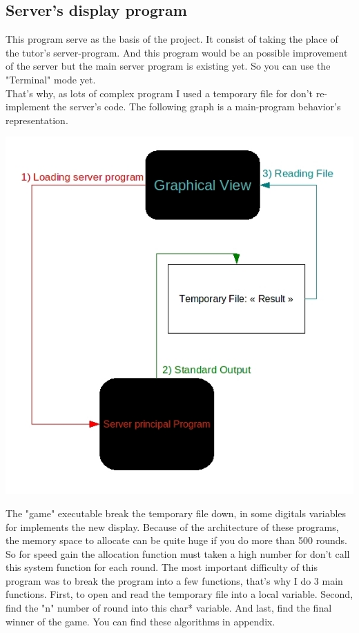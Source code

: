 \documentclass[11pt]{sample}
\begin{document}
\subsection{Server's display program}
This program serve as the basis of the project. It consist of taking the place of the tutor's server-program. And this program would be an possible improvement of the server but the main server program is existing yet. So you can use the "Terminal" mode yet.\\ That's why, as lots of complex program I used a temporary file for don't re-implement the server's code. The following graph is a main-program behavior's representation.
\newpage
\begin{center}\includegraphics[height=22\baselineskip]{img/GraphicalView-diagram.jpg}\end{center}
The "game" executable break the temporary file down, in some digitals variables for implements the new display. Because of the architecture of these programs, the memory space to allocate can be quite huge if you do more than 500 rounds. So for speed gain the allocation function must taken a high number for don't call this system function for each round. The most important difficulty of this program was to break the program into a few functions, that's why I do 3 main functions. First, to open and read the temporary file into a local variable. Second, find the "n" number of round into this char* variable. And last, find the final winner of the game. You can find these algorithms in appendix. 
\newpage
\end{document}
